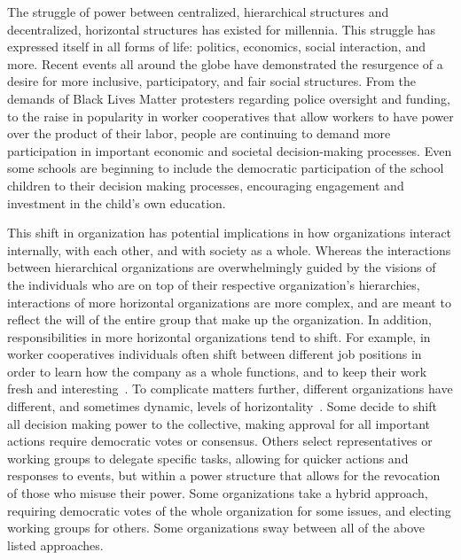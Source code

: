 The struggle of power between centralized, hierarchical structures and
decentralized, horizontal structures has existed for millennia. This struggle has
expressed itself in all forms of life: politics, economics, social interaction,
and more. Recent events all around the globe have demonstrated the resurgence of
a desire for more inclusive, participatory, and fair social structures. From the
demands of Black Lives Matter protesters regarding police oversight and funding,
to the raise in popularity in worker cooperatives that allow workers to have
power over the product of their labor, people are continuing to demand more
participation in important economic and societal decision-making processes. %
Even some schools are beginning to include the democratic participation of the
school children to their decision making processes, encouraging engagement and
investment in the child's own education.~\cite{pacheco2008escola}

This shift in organization has potential implications in how organizations
interact internally, with each other, and with society as a whole. Whereas the
interactions between hierarchical organizations are overwhelmingly guided by
the visions of the individuals who are on top of their respective organization's
hierarchies, interactions of more horizontal organizations are more complex, and
are meant to reflect the will of the entire group that make up the organization.
In addition, responsibilities in more horizontal organizations tend to shift.
For example, in worker cooperatives individuals often shift between different
job positions in order to learn how the company as a whole functions, and to
keep their work fresh and 
interesting~\cite{jackall19846, wright2014worker, lindenfeld1982workplace}.
To complicate matters further, different organizations have different, and
sometimes dynamic, levels of  horizontality~\cite{wright2014worker}. Some decide
to shift all decision making power to the collective, making approval for all
important actions require democratic votes or consensus. Others select
representatives or working groups to delegate specific tasks, allowing for
quicker actions and responses to events, but within a power structure that
allows for the revocation of those who misuse their power. Some organizations
take a hybrid approach, requiring democratic votes of the whole organization for
some issues, and electing working groups for others. Some organizations sway
between all of the above listed approaches.

